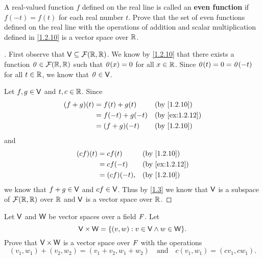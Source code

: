 \begin{ex}\label{ex:1.2.12}
  A real-valued function \(f\) defined on the real line is called an \textbf{even function} if \(f(-t) = f(t)\) for each real number \(t\).
  Prove that the set of even functions defined on the real line with the operations of addition and scalar multiplication defined in \cref{1.2.10} is a vector space over \(\mathbb{R}\).
\end{ex}

\begin{proof}[]
  First observe that \(\mathsf{V} \subseteq \mathcal{F}(\mathbb{R}, \mathbb{R})\).
  We know by \cref{1.2.10} that there exists a function \(\mathit{0} \in \mathcal{F}(\mathbb{R}, \mathbb{R})\) such that \(\mathit{0}(x) = 0\) for all \(x \in \mathbb{R}\).
  Since \(\mathit{0}(t) = 0 = \mathit{0}(-t)\) for all \(t \in \mathbb{R}\), we know that \(\mathit{0} \in \mathsf{V}\).

  Let \(f, g \in \mathsf{V}\) and \(t, c \in \mathbb{R}\).
  Since
  \begin{align*}
    (f + g)(t) & = f(t) + g(t)   &  & \by{1.2.10}    \\
               & = f(-t) + g(-t) &  & \by{ex:1.2.12} \\
               & = (f + g)(-t)   &  & \by{1.2.10}
  \end{align*}
  and
  \begin{align*}
    (cf)(t) & = cf(t)     &  & \by{1.2.10}    \\
            & = cf(-t)    &  & \by{ex:1.2.12} \\
            & = (cf)(-t), &  & \by{1.2.10}
  \end{align*}
  we know that \(f + g \in \mathsf{V}\) and \(cf \in \mathsf{V}\).
  Thus by \cref{1.3} we know that \(\mathsf{V}\) is a subspace of \(\mathcal{F}(\mathbb{R}, \mathbb{R})\) over \(\mathbb{R}\) and \(\mathsf{V}\) is a vector space over \(\mathbb{R}\).
\end{proof}

\setcounter{ex}{20}
\begin{ex}\label{ex:1.2.21}
  Let \(\mathsf{V}\) and \(\mathsf{W}\) be vector spaces over a field \(\mathit{F}\).
  Let
  \[
    \V \times \W = \set{(v, w) : v \in \V \land w \in \W}.
  \]
  Prove that \(\mathsf{V} \times \mathsf{W}\) is a vector space over \(\mathit{F}\) with the operations
  \[
    (v_1, w_1) + (v_2, w_2) = (v_1 + v_2, w_1 + w_2) \quad \text{and} \quad c(v_1, w_1) = (cv_1, cw_1).
  \]
\end{ex}

